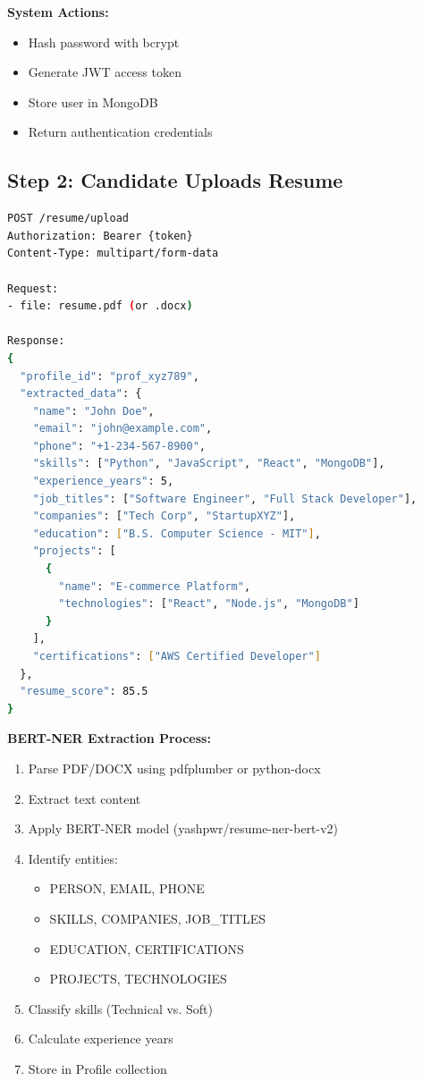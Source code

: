 \documentclass[12pt,a4paper]{article}
\begin{document}
\textbf{System Actions:}
\begin{itemize}
    \item Hash password with bcrypt
    \item Generate JWT access token
    \item Store user in MongoDB
    \item Return authentication credentials
\end{itemize}

\subsection{Step 2: Candidate Uploads Resume}

\begin{lstlisting}[language=bash, caption=Resume Upload API]
POST /resume/upload
Authorization: Bearer {token}
Content-Type: multipart/form-data

Request:
- file: resume.pdf (or .docx)

Response:
{
  "profile_id": "prof_xyz789",
  "extracted_data": {
    "name": "John Doe",
    "email": "john@example.com",
    "phone": "+1-234-567-8900",
    "skills": ["Python", "JavaScript", "React", "MongoDB"],
    "experience_years": 5,
    "job_titles": ["Software Engineer", "Full Stack Developer"],
    "companies": ["Tech Corp", "StartupXYZ"],
    "education": ["B.S. Computer Science - MIT"],
    "projects": [
      {
        "name": "E-commerce Platform",
        "technologies": ["React", "Node.js", "MongoDB"]
      }
    ],
    "certifications": ["AWS Certified Developer"]
  },
  "resume_score": 85.5
}
\end{lstlisting}

\textbf{BERT-NER Extraction Process:}
\begin{enumerate}
    \item Parse PDF/DOCX using pdfplumber or python-docx
    \item Extract text content
    \item Apply BERT-NER model (yashpwr/resume-ner-bert-v2)
    \item Identify entities:
    \begin{itemize}
        \item PERSON, EMAIL, PHONE
        \item SKILLS, COMPANIES, JOB\_TITLES
        \item EDUCATION, CERTIFICATIONS
        \item PROJECTS, TECHNOLOGIES
    \end{itemize}
    \item Classify skills (Technical vs. Soft)
    \item Calculate experience years
    \item Store in Profile collection
\end{enumerate}
\end{document}
